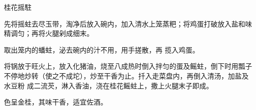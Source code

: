 \begin{recipe}{桂花摇駐}

\ingredients


\cooking

\step 先将摇蛀去尽玉带，淘净后放入碗内，加入清水上笼蒸粑；将鸡蛋打破放入盐和味
精调匀；再将火腿剁成细末。

取出笼内的蟠蛀，泌去碗内的汁不用，用手搓散，再 揽入鸡蛋。

\step 将锅放于旺火上，放入化猪油，烧至八成热时倒入拌匀的蛋及鳐蛀，倒下时用瓢子
不停地炒转（使之不成坨），炒至干香为止。扦入走菜盘内，再倒入清汤，加盐及水豆粉
成二流芡，淋入香油，浇在桂花鳐蛀上，撒上火腿末子即成。

\features

色呈金桂，其味干香，适宜佐酒。

\end{recipe}

